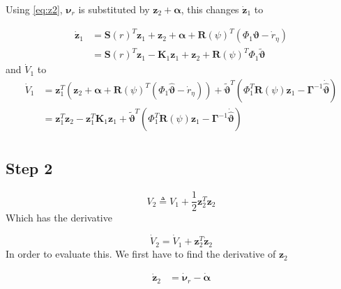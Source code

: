 \documentclass[12pt,a4]{article}
\begin{document}
Using \ref{eq:z2}, $\bm{\nu}_r$ is substituted by $\bm{z}_2 + \bm{\alpha}$, this changes $\bm{\dot{z}}_1$ to

\begin{align}
	\bm{\dot{z}}_1 & = \bm{S}(r)^T\bm{z}_1 + \bm{z}_2 + \bm{\alpha} + \bm{R}(\psi)^T(\Phi_1\bm{\vartheta}- \dot{r}_{\eta}) \\
	               & = \bm{S}(r)^T\bm{z}_1 - \bm{K}_1\bm{z}_1 + \bm{z}_2 + \bm{R}(\psi)^T\Phi_1\bm{\tilde{\vartheta}}
\end{align}
and $\dot{V}_1$ to
\begin{align}
	\dot{V}_1 & = \bm{z}_1^T\left( \bm{z}_2 + \bm{\alpha} + \bm{R}(\psi)^T(\Phi_1\bm{\hat{\vartheta}}- \dot{r}_{\eta}) \right)
	+ \bm{\tilde{\vartheta}} ^T \left( \Phi_1^T\bm{R}(\psi)\bm{z}_1 - \bm{\Gamma}^{-1}\bm{\dot{\hat{\vartheta}}}	\right)        \\
	          & = \bm{z}_1^T \bm{z}_2 -\bm{z}_1^T\bm{K}_1\bm{z}_1
	+ \bm{\tilde{\vartheta}} ^T \left( \Phi_1^T\bm{R}(\psi)\bm{z}_1 - \bm{\Gamma}^{-1}\bm{\dot{\hat{\vartheta}}}	\right)        \\
\end{align}

\subsection{Step 2}


\begin{equation}
	V_2 \triangleq V_1 + \frac{1}{2}\bm{z}_2^T\bm{z}_2
\end{equation}
Which has the derivative

\begin{equation}
	\dot{V}_2 = \dot{V}_1 + \bm{z}_2^T\dot{\bm{z}}_2
\end{equation}
In order to evaluate this. We first have to find the derivative of $\bm{z}_2$

\begin{align}
	\bm{\dot{z}}_2 & = \bm{\dot{\nu}}_r - \bm{\dot{\alpha}}
\end{align}
\end{document}
